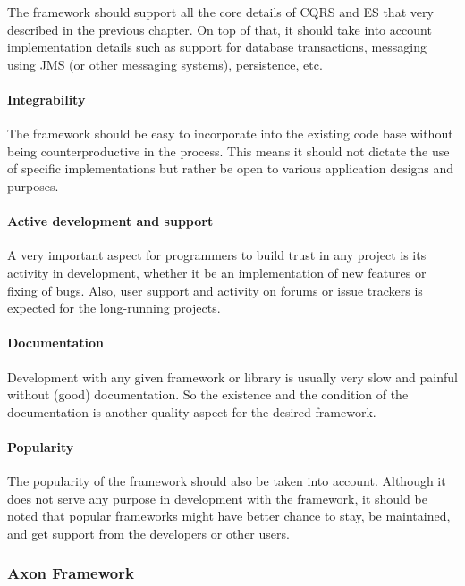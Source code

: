 \documentclass{book}
\begin{document}
The framework should support all the core details of CQRS and ES that
very described in the previous chapter. On top of that, it should take
into account implementation details such as support for database
transactions, messaging using JMS (or other messaging systems),
persistence, etc.

\paragraph{Integrability}\label{integrability}

The framework should be easy to incorporate into the existing code base
without being counterproductive in the process. This means it should not
dictate the use of specific implementations but rather be open to
various application designs and purposes.

\paragraph{Active development and
support}\label{active-development-and-support}

A very important aspect for programmers to build trust in any project is
its activity in development, whether it be an implementation of new
features or fixing of bugs. Also, user support and activity on forums or
issue trackers is expected for the long-running projects.

\paragraph{Documentation}\label{documentation}

Development with any given framework or library is usually very slow and
painful without (good) documentation. So the existence and the condition
of the documentation is another quality aspect for the desired
framework.

\paragraph{Popularity}\label{popularity}

The popularity of the framework should also be taken into account.
Although it does not serve any purpose in development with the
framework, it should be noted that popular frameworks might have better
chance to stay, be maintained, and get support from the developers or
other users.

\subsubsection{Axon Framework}\label{axon-framework}
\end{document}
